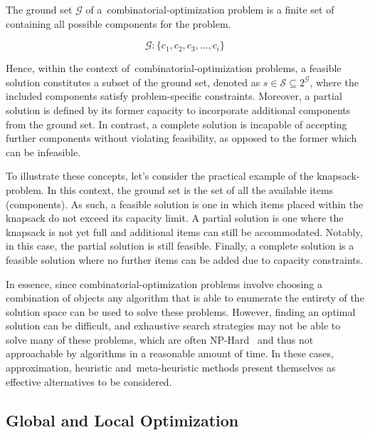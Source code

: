 \begin{definition}
  \label{def:ground-set}
  The ground set $\mathcal{G}$ of a~\acrshort{combinatorial-optimization}
  problem is a finite set of containing all possible components for the problem.

  \begin{equation}
    \label{eq:ground-set}
    \mathcal{G} \colon \{c_{1}, c_{2}, c_{3}, \ldots, c_{i}\}
  \end{equation}
\end{definition}

Hence, within the context of~\acrshort{combinatorial-optimization} problems, a
feasible solution constitutes a subset of the ground set, denoted as $s \in
  \mathcal{S} \subseteq 2^{\mathcal{G}}$, where the included components satisfy
problem-specific constraints. Moreover, a partial solution is defined by its
former capacity to incorporate additional components from the ground set. In
contrast, a complete solution is incapable of accepting further components
without violating feasibility, as opposed to the former which can be infeasible.

To illustrate these concepts, let's consider the practical example of the
\acrshort{knapsack-problem}. In this context, the ground set is the set of all
the available items (components). As such, a feasible solution is one in which
items placed within the knapsack do not exceed its capacity limit. A partial
solution is one where the knapsack is not yet full and additional items can
still be accommodated. Notably, in this case, the partial solution is still
feasible. Finally, a complete solution is a feasible solution where no further
items can be added due to capacity constraints.

In essence, since \acrshort{combinatorial-optimization} problems involve
choosing a combination of objects any algorithm that is able to enumerate the
entirety of the solution space can be used to solve these problems. However,
finding an optimal solution can be difficult, and exhaustive search strategies
may not be able to solve many of these problems, which are often
NP-Hard~\cite{yu2010combinatorial,festa2014brief} and thus not approachable by
algorithms in a reasonable amount of time. In these cases, approximation,
heuristic and~\acrshort{meta-heuristic} methods present themselves as effective
alternatives to be considered.

\subsection{Global and Local Optimization}

